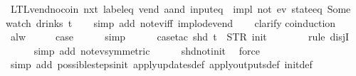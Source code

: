 \begin{isabellebody}
%
\endisatagproof
{\isafoldproof}%
%
\isadelimproof
\isanewline
%
\endisadelimproof
\isanewline
{}\isamarkupfalse%
\ LTL{\isacharunderscore}vend{\isacharunderscore}no{\isacharunderscore}coin{\isacharcolon}\ {\isachardoublequoteopen}{\isacharparenleft}{\isacharparenleft}nxt\ {\isacharparenleft}label{\isacharunderscore}eq\ {\isacharprime}{\isacharprime}vend{\isacharprime}{\isacharprime}\ aand\ input{\isacharunderscore}eq\ {\isacharbrackleft}{\isacharbrackright}{\isacharparenright}{\isacharparenright}\ impl\ not\ {\isacharparenleft}ev\ {\isacharparenleft}state{\isacharunderscore}eq\ {\isacharparenleft}Some\ {}{\isacharparenright}{\isacharparenright}{\isacharparenright}{\isacharparenright}\ {\isacharparenleft}watch\ drinks\ t{\isacharparenright}{\isachardoublequoteclose}\isanewline
%
\isadelimproof
\ \ %
\endisadelimproof
%
\isatagproof
{}\isamarkupfalse%
\ {\isacharparenleft}simp\ add{\isacharcolon}\ not{\isacharunderscore}ev{\isacharunderscore}iff\ implode{\isacharunderscore}vend{\isacharparenright}\isanewline
\ \ \isamarkupfalse%
\ clarify\isanewline
{}\isamarkupfalse%
{\isacharparenleft}coinduction{\isacharparenright}\isanewline
\ \ \isamarkupfalse%
\ alw\isanewline
\ \ \isamarkupfalse%
\ \isamarkupfalse%
\ {\isacharquery}case\isanewline
\ \ \ \ \isamarkupfalse%
\ simp\isanewline
\ \ \ \ \isamarkupfalse%
\ {\isacharparenleft}case{\isacharunderscore}tac\ {\isachardoublequoteopen}shd\ t\ {\isasymnoteq}\ {\isacharparenleft}STR\ {\isacharprime}{\isacharprime}init{\isacharprime}{\isacharprime}{\isacharcomma}\ {\isacharbrackleft}{\isacharbrackright}{\isacharparenright}{\isachardoublequoteclose}{\isacharparenright}\isanewline
\ \ \ \ \ \isamarkupfalse%
\ {\isacharparenleft}rule\ disjI{}{\isacharparenright}\isanewline
\ \ \ \ \isamarkupfalse%
\ {\isacharparenleft}simp\ add{\isacharcolon}\ not{\isacharunderscore}ev{\isacharbrackleft}symmetric{\isacharbrackright}{\isacharparenright}\isanewline
\ \ \ \ \isamarkupfalse%
\ shd{\isacharunderscore}not{\isacharunderscore}init\ \isamarkupfalse%
\ force\isanewline
\ \ \ \ \isamarkupfalse%
\ {\isacharparenleft}simp\ add{\isacharcolon}\ possible{\isacharunderscore}steps{\isacharunderscore}init\ apply{\isacharunderscore}updates{\isacharunderscore}def\ apply{\isacharunderscore}outputs{\isacharunderscore}def\ init{\isacharunderscore}def{\isacharparenright}\isanewline

\end{isabellebody}
